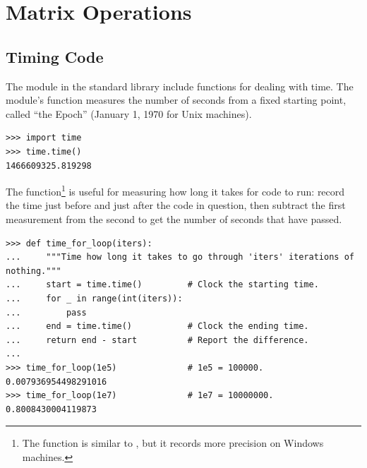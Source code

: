 
\section*{Matrix Operations} %

\subsection*{Timing Code} %

The  module in the standard library include functions for dealing with time.
The module's  function measures the number of seconds from a fixed starting point, called ``the Epoch'' (January 1, 1970 for Unix machines).

\begin{lstlisting}
>>> import time
>>> time.time()
1466609325.819298
\end{lstlisting}

The  function\footnote{The  function is similar to , but it records more precision on Windows machines.} is useful for measuring how long it takes for code to run: record the time just before and just after the code in question, then subtract the first measurement from the second to get the number of seconds that have passed.

\begin{lstlisting}
>>> def time_for_loop(iters):
...     """Time how long it takes to go through 'iters' iterations of nothing."""
...     start = time.time()         # Clock the starting time.
...     for _ in range(int(iters)):
...         pass
...     end = time.time()           # Clock the ending time.
...     return end - start          # Report the difference.
...
>>> time_for_loop(1e5)              # 1e5 = 100000.
0.007936954498291016
>>> time_for_loop(1e7)              # 1e7 = 10000000.
0.8008430004119873
\end{lstlisting}


